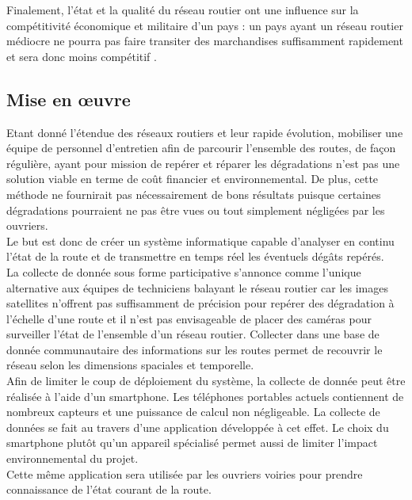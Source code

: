 Finalement, l'état et la qualité du réseau routier ont une influence sur la
compétitivité économique et militaire d'un pays : un pays ayant un réseau
routier médiocre ne pourra pas faire transiter des marchandises suffisamment
rapidement et sera donc moins compétitif \cite{economique}.


\subsection{Mise en \oe{}uvre}
Etant donné l'étendue des réseaux routiers et leur rapide évolution, mobiliser
une équipe de personnel d'entretien afin de parcourir l'ensemble des routes, de
façon régulière, ayant pour mission de repérer et réparer les dégradations
n'est pas une
solution viable en terme de coût financier et environnemental. De plus, cette
méthode ne fournirait pas nécessairement de bons résultats puisque certaines
dégradations pourraient ne pas être vues ou tout simplement négligées par les
ouvriers.\\

Le but est donc de créer un système informatique capable d'analyser en continu
l'état de la
route et de transmettre en temps réel les éventuels dégâts repérés.\\

La collecte de donnée sous forme participative s'annonce comme l'unique
alternative aux équipes de techniciens balayant le réseau routier car les
images satellites
n'offrent pas suffisamment de précision pour repérer des dégradation à
l'échelle d'une route et il n'est pas envisageable de placer des caméras pour
surveiller l'état de l'ensemble d'un réseau routier. Collecter dans une base de
donnée communautaire des informations sur les routes permet de recouvrir
le réseau selon les dimensions spaciales et temporelle.\\

Afin de limiter le coup de déploiement du système, la collecte de donnée
peut être réalisée à l'aide d'un smartphone. Les téléphones portables
actuels contiennent de nombreux capteurs et une puissance de calcul non
négligeable. La collecte de données se fait au travers d'une
application développée à cet effet. Le choix du smartphone plutôt qu'un
appareil spécialisé permet aussi de limiter l'impact environnemental du
projet.\\
Cette même application sera utilisée par les ouvriers voiries pour prendre connaissance de l'état courant de la route.\\

